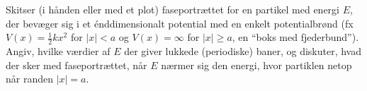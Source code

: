 \begin{opgave}
Skitser (i hånden eller med et plot) faseportrættet for en partikel med
energi $E$, der bevæger sig i et énddimensionalt potential med en
enkelt potentialbrønd (fx $V(x)=\frac12 kx^2$ for $|x|<a$ og
$V(x)=\infty$ for $|x|\geq a$, en ``boks med fjederbund''). Angiv, hvilke
værdier af $E$ der giver lukkede (periodiske) baner, og diskuter, hvad
der sker med faseportrættet, når $E$ nærmer sig den energi, hvor
partiklen netop når randen $|x|=a$.
\end{opgave}
